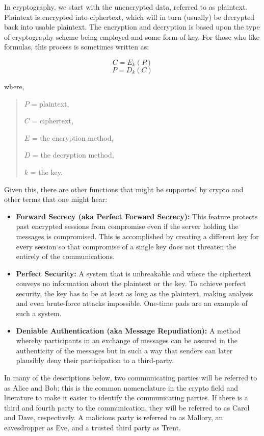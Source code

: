 \documentclass[british]{article}
\begin{document}
In cryptography, we start with the unencrypted data, referred to as
plaintext. Plaintext is encrypted into ciphertext, which will in turn
(usually) be decrypted back into usable plaintext. The encryption
and decryption is based upon the type of cryptography scheme being
employed and some form of key. For those who like formulas, this process
is sometimes written as:

\[
	C=E_{k}(P)
\]
\[
	P=D_{k}(C)
\]

where,
\begin{verse}
	$P$ = plaintext,

	$C$ = ciphertext,

	$E$ = the encryption method,

	$D$ = the decryption method,

	$k$ = the key.
\end{verse}
Given this, there are other functions that might be supported by crypto
and other terms that one might hear:
\begin{itemize}
	\item \textbf{Forward Secrecy (aka Perfect Forward Secrecy):} This feature
	      protects past encrypted sessions from compromise even if the server
	      holding the messages is compromised. This is accomplished by creating
	      a different key for every session so that compromise of a single key
	      does not threaten the entirely of the communications.
	\item \textbf{Perfect Security: }A system that is unbreakable and where
	      the ciphertext conveys no information about the plaintext or the key.
	      To achieve perfect security, the key has to be at least as long as
	      the plaintext, making analysis and even brute-force attacks impossible.
	      One-time pads are an example of such a system.
	\item \textbf{Deniable Authentication (aka Message Repudiation): }A method
	      whereby participants in an exchange of messages can be assured in
	      the authenticity of the messages but in such a way that senders can
	      later plausibly deny their participation to a third-party.
\end{itemize}
In many of the descriptions below, two communicating parties will
be referred to as Alice and Bob; this is the common nomenclature in
the crypto field and literature to make it easier to identify the
communicating parties. If there is a third and fourth party to the
communication, they will be referred to as Carol and Dave, respectively.
A malicious party is referred to as Mallory, an eavesdropper as Eve,
and a trusted third party as Trent.
\end{document}
